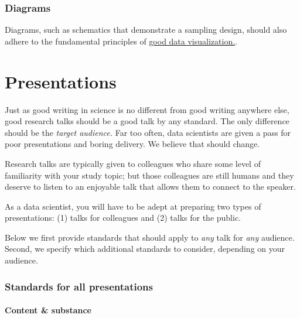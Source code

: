 \documentclass[
]{book}
\begin{document}
\hypertarget{diagrams}{%
\subsection*{Diagrams}\label{diagrams}}

Diagrams, such as schematics that demonstrate a sampling design, should also adhere to the fundamental principles of \protect\hyperlink{datavis}{good data visualization.}.

\hypertarget{presentations}{%
\chapter{Presentations}\label{presentations}}

Just as good writing in science is no different from good writing anywhere else, good research talks should be a good talk by any standard. The only difference should be the \emph{target audience.} Far too often, data scientists are given a pass for poor presentations and boring delivery. We believe that should change.

Research talks are typically given to colleagues who share some level of familiarity with your study topic; but those colleagues are still humans and they deserve to listen to an enjoyable talk that allows them to connect to the speaker.

As a data scientist, you will have to be adept at preparing two types of presentations: (1) talks for colleagues and (2) talks for the public.

Below we first provide standards that should apply to \emph{any} talk for \emph{any} audience. Second, we specify which additional standards to consider, depending on your audience.

\hypertarget{standards-for-all-presentations}{%
\subsection*{Standards for all presentations}\label{standards-for-all-presentations}}

\hypertarget{content-substance}{%
\subsubsection*{Content \& substance}\label{content-substance}}
\end{document}
